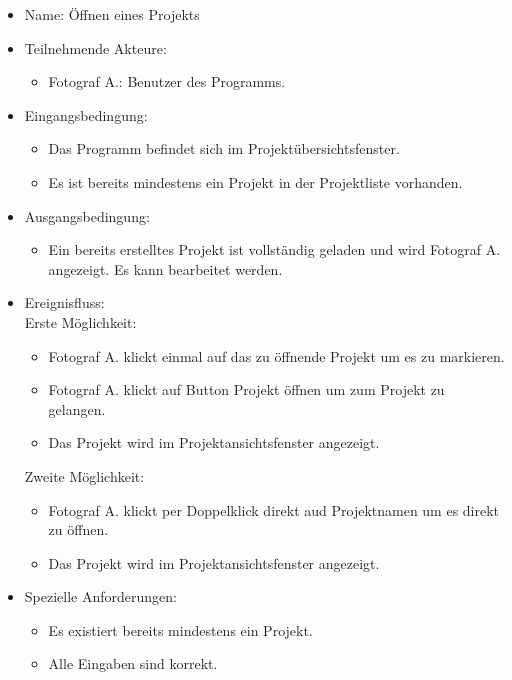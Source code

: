 \begin{itemize}
		\begin{itemize}
			\item Name: Öffnen eines Projekts
			\item Teilnehmende Akteure:
			\begin{itemize}
				\item	Fotograf A.: Benutzer des Programms.		
			\end{itemize}
			\item Eingangsbedingung:
			\begin{itemize}
				\item	Das Programm befindet sich im Projektübersichtsfenster.
				\item Es ist bereits mindestens ein Projekt in der Projektliste vorhanden.
			\end{itemize}
			\item Ausgangsbedingung:
			\begin{itemize}
				\item	Ein bereits erstelltes Projekt ist vollständig geladen und wird Fotograf A. angezeigt. Es kann bearbeitet werden.		
			\end{itemize}
			\item Ereignisfluss:\\Erste Möglichkeit:
			\begin{itemize}
				\item Fotograf A. klickt einmal auf das zu öffnende Projekt um es zu markieren.
				\item Fotograf A. klickt auf Button Projekt öffnen um zum Projekt zu gelangen.
				\item Das Projekt wird im Projektansichtsfenster angezeigt.
			\end{itemize}
			Zweite Möglichkeit:
			\begin{itemize}
				\item Fotograf A. klickt per Doppelklick direkt aud Projektnamen um es direkt zu öffnen.
				\item Das Projekt wird im Projektansichtsfenster angezeigt.					
			\end{itemize}
			\item Spezielle Anforderungen:
			\begin{itemize}
				\item	Es existiert bereits mindestens ein Projekt.
				\item Alle Eingaben sind korrekt.
			\end{itemize}			
		\end{itemize}
		

\end{itemize}
